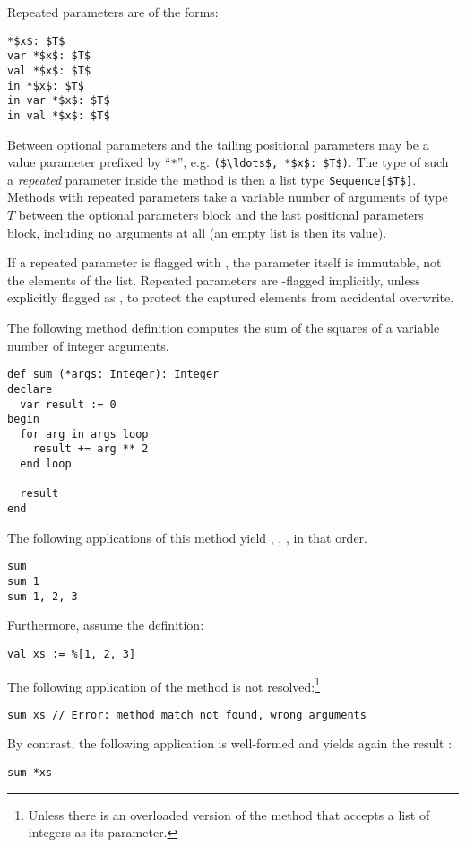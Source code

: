 Repeated parameters are of the forms:
\begin{lstlisting}
*$x$: $T$
var *$x$: $T$
val *$x$: $T$
in *$x$: $T$
in var *$x$: $T$
in val *$x$: $T$
\end{lstlisting}

Between optional parameters and the tailing positional parameters may be a value parameter prefixed by ``\lstinline!*!'', e.g. \lstinline!($\ldots$, *$x$: $T$)!. The type of such a {\em repeated} parameter inside the method is then a list type \lstinline!Sequence[$T$]!. Methods with repeated parameters take a variable number of arguments of type $T$ between the optional parameters block and the last positional parameters block, including no arguments at all (an empty list is then its value). 

If a repeated parameter is flagged with , the parameter itself is immutable, not the elements of the list. Repeated parameters are -flagged implicitly, unless explicitly flagged as , to protect the captured elements from accidental overwrite. 

\example The following method definition computes the sum of the squares of a variable number of integer arguments.
\begin{lstlisting}
def sum (*args: Integer): Integer
declare
  var result := 0
begin
  for arg in args loop
    result += arg ** 2
  end loop
  
  result
end
\end{lstlisting}
The following applications of this method yield , , , in that order.
\begin{lstlisting}
sum
sum 1
sum 1, 2, 3
\end{lstlisting}
Furthermore, assume the definition:
\begin{lstlisting}
val xs := %[1, 2, 3]
\end{lstlisting}
The following application of the method  is not resolved:\footnote{Unless there is an overloaded version of the method that accepts a list of integers as its parameter.}
\begin{lstlisting}
sum xs // Error: method match not found, wrong arguments
\end{lstlisting}
By contrast, the following application is well-formed and yields again the result :
\begin{lstlisting}
sum *xs
\end{lstlisting}






